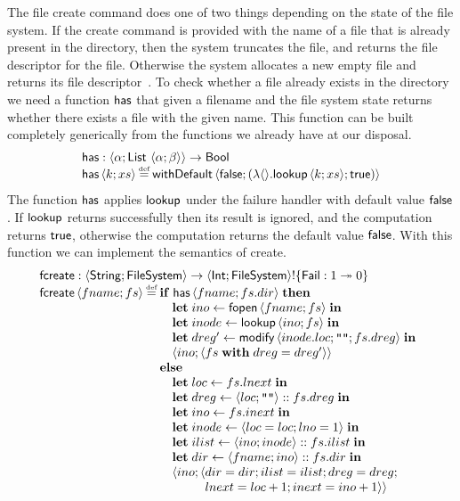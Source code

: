 \documentclass[12pt,phd,lfcs,twoside,openright,logo,leftchapter,normalheadings]{infthesis}
\theoremstyle{plain}
\theoremstyle{definition}
\begin{document}
The \UNIX{} file create command does one of two things depending on
the state of the file system. If the create command is provided with
the name of a file that is already present in the directory, then the
system truncates the file, and returns the file descriptor for the
file. Otherwise the system allocates a new empty file and returns its
file descriptor~\cite{RitchieT74}. To check whether a file already
exists in the directory we need a function $\mathsf{has}$ that given a
filename and the file system state returns whether there exists a file
with the given name. This function can be built completely generically
from the functions we already have at our disposal.
%
\[
  \bl
    \dec{has} : \Record{\alpha;\List~\Record{\alpha;\beta}} \to \Bool\\
    \dec{has}\,\Record{k;xs} \defas \faild\,\Record{\False;(\lambda\Unit.\lookup\,\Record{k;xs};\True)}
  \el
\]
%
The function $\mathsf{has}$ applies $\mathsf{lookup}$ under the failure handler
with default value $\mathsf{false}$. If $\mathsf{lookup}$ returns successfully then
its result is ignored, and the computation returns $\mathsf{true}$, otherwise
the computation returns the default value $\mathsf{false}$.
%
With this function we can implement the semantics of create.
%
\[
  \bl
    \fcreate : \Record{\String;\FileSystem} \to \Record{\Int;\FileSystem} \eff \{\Fail : \UnitType \opto \ZeroType\}\\
    \fcreate\,\Record{fname;fs} \defas
      \ba[t]{@{}l}
        \If\;\dec{has}\,\Record{fname;fs.dir}\;\Then\\
          \quad\bl
            \Let\;ino   \revto \fopen\,\Record{fname;fs}\;\In\\
            \Let\;inode \revto \lookup\,\Record{ino;fs}\;\In\\
            \Let\;dreg' \revto \modify\,\Record{inode.loc; \strlit{}; fs.dreg}\;\In\\
            \Record{ino;\Record{fs\;\With\;dreg = dreg'}}
          \el\\
        \Else\\
        \quad\bl
          \Let\;loc \revto fs.lnext \;\In\\
          \Let\;dreg \revto \Record{loc; \strlit{}} \cons fs.dreg\;\In\\
          \Let\;ino \revto fs.inext \;\In\\
          \Let\;inode \revto \Record{loc=loc;lno=1}\;\In\\
          \Let\;ilist \revto \Record{ino;inode} \cons fs.ilist \;\In\\
          \Let\;dir   \revto \Record{fname; ino} \cons fs.dir \;\In\\
          \Record{ino;\Record{
              \bl
                dir=dir;ilist=ilist;dreg=dreg;\\
                lnext=loc+1;inext=ino+1}}
              \el
        \el
      \el
  \el
\]
\end{document}
